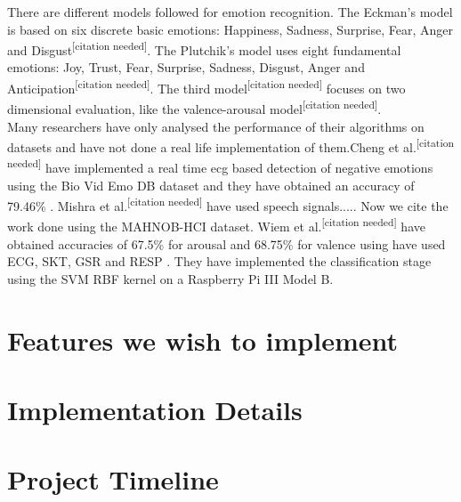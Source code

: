 \documentclass[11pt]{article}
\theoremstyle{definition}
\begin{document}
There are different models followed for emotion recognition. The Eckman's model is based on six discrete basic emotions: Happiness, Sadness, Surprise, Fear, Anger and Disgust\textsuperscript{[citation needed]}. The Plutchik's model uses eight fundamental emotions: Joy, Trust, Fear, Surprise, Sadness, Disgust, Anger and Anticipation\textsuperscript{[citation needed]}. The third model\textsuperscript{[citation needed]} focuses on two dimensional evaluation, like the valence-arousal model\textsuperscript{[citation needed]}.\\

Many researchers have only analysed the performance of their algorithms on datasets and have not done a real life implementation of them.Cheng et al.\textsuperscript{[citation needed]} have implemented a real time ecg based detection of negative emotions using the Bio Vid Emo DB dataset and they have obtained an accuracy of 79.46\% . Mishra et al.\textsuperscript{[citation needed]} have used speech signals.....
Now we cite the work done using the MAHNOB-HCI dataset. Wiem et al.\textsuperscript{[citation needed]} have obtained accuracies of 67.5\% for arousal and 68.75\% for valence using have used ECG, SKT, GSR and RESP . They have implemented the classification stage using the SVM RBF kernel on a Raspberry Pi III Model B. 
    
  \section{Features we wish to implement}

  \section{Implementation Details}

  \section{Project Timeline}
  
\end{document}
